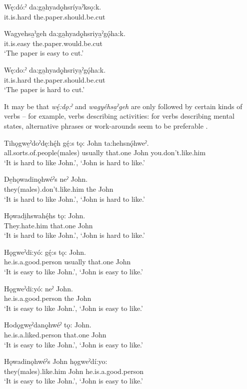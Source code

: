 \ea\label{ex:sidebysidex120}
\gll Wę:dó:ˀ da:ga̱hyadǫ̱hsríyaˀksǫ:k.\\
it.is.hard the.paper.should.be.cut\\
\glt {}
\z

\ea\label{ex:sidebysidex13} 
\gll Wagyehsa̱ˀgeh da:ga̱hyadǫ̱hsriya̱ˀgǫ́ha:k.\\
it.is.easy the.paper.would.be.cut\\
\glt ‘The paper is easy to cut.’
\z

\ea\label{ex:sidebysidex130} 
\gll Wę:do:ˀ da:ga̱hyadǫ̱hsriya̱ˀgǫ́ha:k.\\
it.is.hard the.paper.should.be.cut\\
\glt ‘The paper is hard to cut.’
\z

It may be that \textit{wę́:dǫ:ˀ} and \textit{wagyéhsa̱ˀgeh} are only followed by certain kinds of verbs -- for example, verbs describing activities: for verbs describing mental states, alternative phrases or work-arounds seem to be preferable . 

\ea\label{ex:sidebysidex14}
\gll Tihǫgwe̱ˀdoˀdę:hę́h gę́:s tǫ: John ta:hehsnǫ́hweˀ.\\
all.sorts.of.people(males) usually that.one John you.don’t.like.him\\
\glt ‘It is hard to like John.’, ‘John is hard to like.’ 
\z

\ea\label{ex:sidebysidex140}
\gll De̱hǫwadinǫ̱hwéˀs neˀ John.\\
they(males).don’t.like.him the John\\
\glt ‘It is hard to like John.’, ‘John is hard to like.’
\z

\ea\label{ex:sidebysidex141}
\gll Hǫwadi̱hswahę́hs tǫ: John.\\
They.hate.him that.one John\\
\glt ‘It is hard to like John.’, ‘John is hard to like.’ 
\z

\ea\label{ex:sidebysidex142}
\gll Hǫgweˀdi:yó: gę́:s tǫ: John.\\
he.is.a.good.person usually that.one John\\
\glt ‘It is easy to like John.’, ‘John is easy to like.’
\z

\ea\label{ex:sidebysidex143}
\gll Hǫgweˀdi:yó: neˀ John.\\
he.is.a.good.person the John\\
\glt ‘It is easy to like John.’, ‘John is easy to like.’
\z

\ea\label{ex:sidebysidex144}
\gll Hodǫgwe̱ˀdanǫ̱hwéˀ tǫ: John.\\
he.is.a.liked.person that.one John\\
\glt ‘It is easy to like John.’, ‘John is easy to like.’
\z

\ea\label{ex:sidebysidex145}
\gll Hǫwadinǫhwéˀs John hǫgweˀdí:yo:\\
they(males).like.him John he.is.a.good.person\\
\glt ‘It is easy to like John.’, ‘John is easy to like.’
\z
